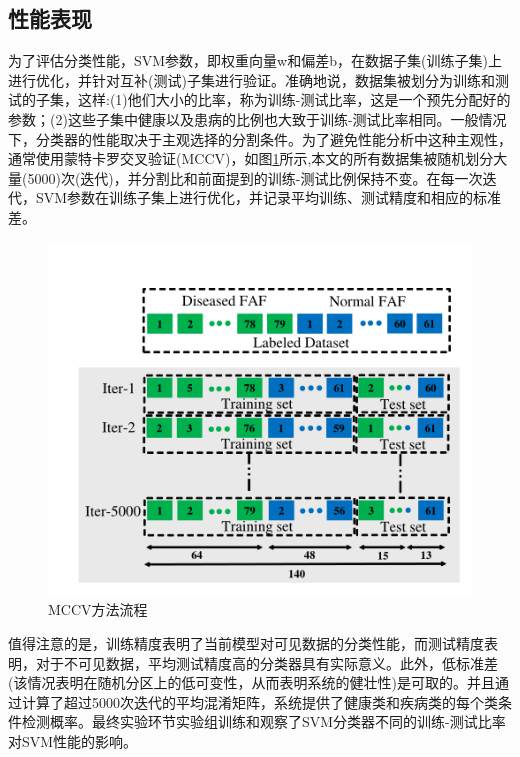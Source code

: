\subsection{性能表现}
为了评估分类性能，SVM参数，即权重向量w和偏差b，在数据子集(训练子集)上进行优化，并针对互补(测试)子集进行验证。准确地说，数据集被划分为训练和测试的子集，这样:(1)他们大小的比率，称为训练-测试比率，这是一个预先分配好的参数；(2)这些子集中健康以及患病的比例也大致于训练-测试比率相同。一般情况下，分类器的性能取决于主观选择的分割条件。为了避免性能分析中这种主观性，通常使用蒙特卡罗交叉验证(MCCV)\cite{2001Monte}，如图\ref{fig:MCCV}所示,本文的所有数据集被随机划分大量(5000)次(迭代)，并分割比和前面提到的训练-测试比例保持不变。在每一次迭代，SVM参数在训练子集上进行优化，并记录平均训练、测试精度和相应的标准差。
\begin{figure}
    \centering
    \includegraphics{figures/MCCV.PNG}
    \caption{MCCV方法流程}
    \label{fig:MCCV}
\end{figure}

值得注意的是，训练精度表明了当前模型对可见数据的分类性能，而测试精度表明，对于不可见数据，平均测试精度高的分类器具有实际意义。此外，低标准差(该情况表明在随机分区上的低可变性，从而表明系统的健壮性)是可取的。并且通过计算了超过5000次迭代的平均混淆矩阵，系统提供了健康类和疾病类的每个类条件检测概率。最终实验环节实验组训练和观察了SVM分类器不同的训练-测试比率对SVM性能的影响。